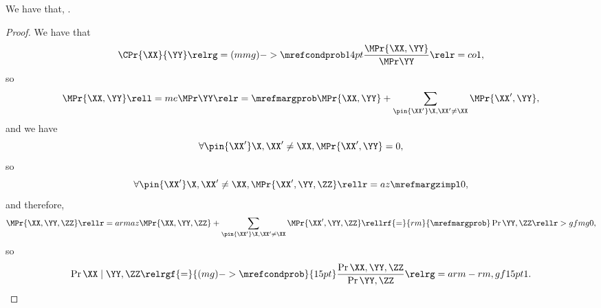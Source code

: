 \begin{proposition}
  We have that, \ponecindprop.%
\end{proposition}

\begin{proof}
  We have that 
  $$\CPr{\XX}{\YY} \relrg = (mmg)->{\mrefcondprob} 14pt \frac{\MPr{\XX, \YY}}{\MPr\YY} \relr = co 1,$$
  so 
  \def\notx{\pin{\XX'}\X, \XX' \ne \XX}
  $$\MPr{\XX, \YY} \rell = me \MPr\YY \relr = {\mrefmargprob} \MPr{\XX, \YY} + \sum_{\notx}\MPr{\XX', \YY},$$
  and we have
  $$\forall \notx, \MPr{\XX',\YY} = 0,$$
  so
  $$\forall \notx, \MPr{\XX',\YY,\ZZ} \rellr = az {\mrefmargzimpl} 0,$$
  and therefore, $$\MPr{\XX,\YY,\ZZ} \rellr = arm az \MPr{\XX,\YY,\ZZ} + \sum_{\notx}\MPr{\XX',\YY,\ZZ}
  \rellrf{=}{rm}{\mrefmargprob} \Pr{\YY, \ZZ} \rellr > gf mg 0,$$
  so $$\Pr{\XX \mid \YY, \ZZ} 
  \relrgf{=}{(mg)->\mrefcondprob}{15pt} \frac{\Pr{\XX, \YY, \ZZ}}{\Pr{\YY, \ZZ}} 
  \relrg = arm-rm,gf 15pt 1.$$%
\end{proof}
